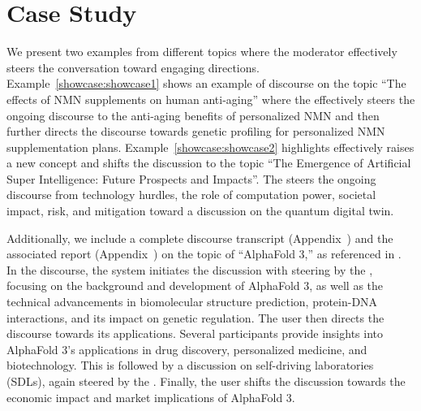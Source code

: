 \section{Case Study}
We present two examples from different topics where the moderator effectively steers the conversation toward engaging directions. Example~\ref{showcase:showcase1} shows an example of discourse on the topic ``The effects of NMN supplements on human anti-aging'' where the \moderator effectively steers the ongoing discourse to the anti-aging benefits of personalized NMN and then further directs the discourse towards genetic profiling for personalized NMN supplementation plans. Example~\ref{showcase:showcase2} highlights \moderator effectively raises a new concept and shifts the discussion to the topic ``The Emergence of Artificial Super Intelligence: Future Prospects and Impacts''. The \moderator steers the ongoing discourse from technology hurdles, the role of computation power, societal impact, risk, and mitigation toward a discussion on the quantum digital twin.

Additionally, we include a complete discourse transcript (Appendix~) and the associated report (Appendix~) on the topic of “AlphaFold 3,” as referenced in . In the discourse, the system initiates the discussion with steering by the \moderator, focusing on the background and development of AlphaFold 3, as well as the technical advancements in biomolecular structure prediction, protein-DNA interactions, and its impact on genetic regulation. The user then directs the discourse towards its applications. Several participants provide insights into AlphaFold 3’s applications in drug discovery, personalized medicine, and biotechnology. This is followed by a discussion on self-driving laboratories (SDLs), again steered by the \moderator. Finally, the user shifts the discussion towards the economic impact and market implications of AlphaFold 3.




